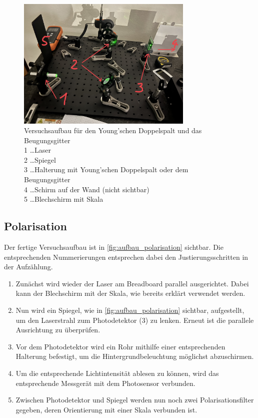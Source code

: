 \documentclass[12pt,english,ngerman]{scrartcl}
\begin{document}
\begin{figure}[H]
	\begin{center}
		\includegraphics[width =0.75\textwidth]{./figures/aufbau_doppelspalt.jpg}
	\end{center}
	\caption[Versuchsaufbau für den Young'schen Doppelspalt und das Beugungsgitter] {
		Versuchsaufbau für den Young'schen Doppelspalt und das Beugungsgitter \\
		1 \dots Laser                                                         \\
		2 \dots Spiegel                                                       \\
		3 \dots Halterung mit Young'schen Doppelspalt oder dem Beugungsgitter \\
		4 \dots Schirm auf der Wand (nicht sichtbar)                          \\
		5 \dots Blechschirm mit Skala
	}\label{fig:aufbau_doppelspalt}
\end{figure}

\subsection{Polarisation}

Der fertige Versuchsaufbau ist in \autoref{fig:aufbau_polarisation} sichtbar.
Die entsprechenden Nummerierungen entsprechen dabei den Justierungsschritten in
der Aufzählung.

\begin{enumerate}
	\item Zunächst wird wieder der Laser am Breadboard parallel ausgerichtet. Dabei kann
	      der Blechschirm mit der Skala, wie bereits erklärt verwendet werden.
	\item Nun wird ein Spiegel, wie in \autoref{fig:aufbau_polarisation} sichtbar,
	      aufgestellt, um den Laserstrahl zum Photodetektor (3) zu lenken. Erneut ist die
	      parallele Ausrichtung zu überprüfen.
	\item Vor dem Photodetektor wird ein Rohr mithilfe einer entsprechenden Halterung
	      befestigt, um die Hintergrundbeleuchtung möglichst abzuschirmen.
	\item Um die entsprechende Lichtintensität ablesen zu können, wird das entsprechende
	      Messgerät mit dem Photosensor verbunden.
	\item Zwischen Photodetektor und Spiegel werden nun noch zwei Polarisationsfilter
	      gegeben, deren Orientierung mit einer Skala verbunden ist.
\end{enumerate}
\end{document}
